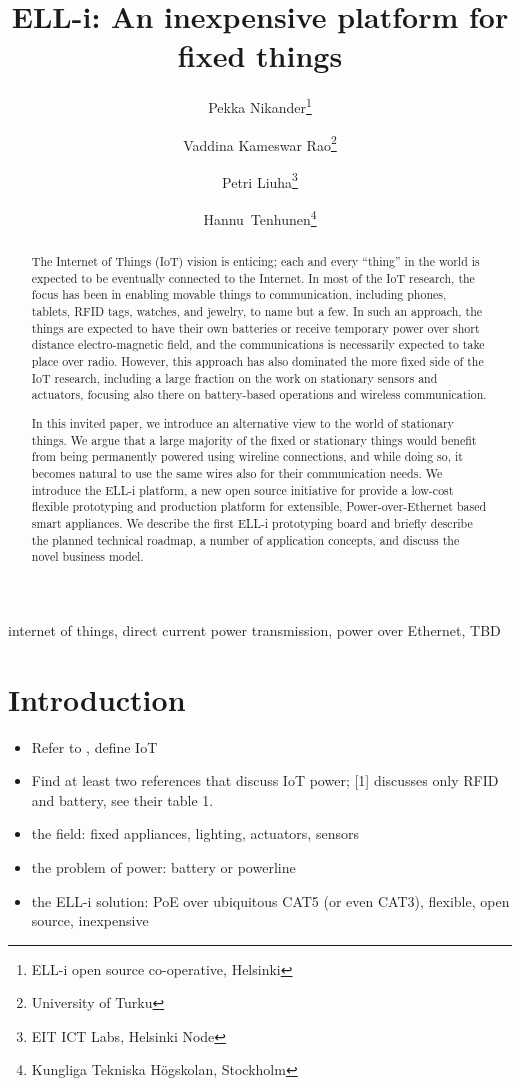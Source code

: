 \documentclass[draft,a4paper]{siamltex}
\title{{ELL-i}: An inexpensive platform for fixed things}
\author{Pekka Nikander\thanks{{ELL-i} open source co-operative, Helsinki}
  \and Vaddina Kameswar Rao\thanks{University of Turku}
  \and Petri Liuha\thanks{EIT ICT Labs, Helsinki Node}
  \and \hbox{Hannu Tenhunen}\thanks{Kungliga Tekniska H\"{o}gskolan, Stockholm}}
\begin{document}
\maketitle

\begin{abstract}
The Internet of Things (IoT) vision is enticing; each and every
``thing'' in the world is expected to be eventually connected to the
Internet.  In most of the IoT research, the focus has been in enabling
movable things to communication, including phones, tablets, RFID tags,
watches, and jewelry, to name but a few.  In such an approach, the
things are expected to have their own batteries or receive temporary
power over short distance electro-magnetic field, and the
communications is necessarily expected to take place over radio.
However, this approach has also dominated the more fixed side of the
IoT research, including a large fraction on the work on stationary
sensors and actuators, focusing also there on battery-based operations
and wireless communication. 

In this invited paper, we introduce an alternative view to the world
of stationary things.  We argue that a large majority of the fixed or
stationary things would benefit from being permanently powered using
wireline connections, and while doing so, it becomes natural to use
the same wires also for their communication needs.  We introduce the
ELL-i platform, a new open source initiative for provide a low-cost
flexible prototyping and production platform for extensible,
Power-over-Ethernet based smart appliances.  We describe the first
ELL-i prototyping board and briefly describe the planned technical
roadmap, a number of application concepts, and discuss the novel
business model. 
\end{abstract}

\begin{keywords} 
internet of things, direct current power transmission, power over
Ethernet, TBD
\end{keywords}

\pagestyle{myheadings}
\thispagestyle{plain}


\section{Introduction}

\begin{itemize}
  \item Refer to \cite{Atzori20102787}, define IoT
  \item Find at least two references that discuss IoT power; [1]
    discusses only RFID and battery, see their table 1. 
  \item the field: fixed appliances, lighting, actuators, sensors
  \item the problem of power: battery or powerline
  \item the ELL-i solution: PoE over ubiquitous CAT5 (or even CAT3),
    flexible, open source, inexpensive 
\end{itemize}
\end{document}
